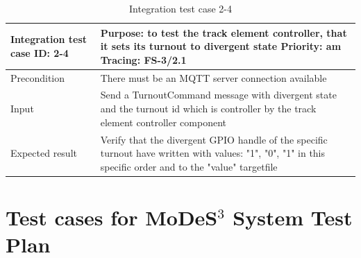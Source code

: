 \begin{table}[H]
	\caption{Integration test case 2-4}
	\label{table:TCase-FSI2-4}
	\begin{center}
		\renewcommand{\arraystretch}{1.8}
		\begin{tabu} 
			to 0.9 \textwidth
			{  X[0.3, l] X[l] }
			\toprule
			Integration test case ID: 2-4 & Purpose: to test the track element controller, that it sets its turnout to divergent state  \newline Priority: am \newline Tracing: FS-3/2.1               \\ \midrule
			Precondition                  & There must be an MQTT server connection available                                                                                                          \\
			Input                         & Send a TurnoutCommand message with divergent state and the turnout id which is controller by the track element controller component                        \\
			Expected result               & Verify that the divergent GPIO handle of the specific turnout have written with values: "1", "0", "1" in this specific order and to the "value" targetfile \\ \bottomrule
		\end{tabu}
	\end{center}
\end{table} 


\section{Test cases for MoDeS$^3$ System Test Plan} \label{appendix:SystemTC}


